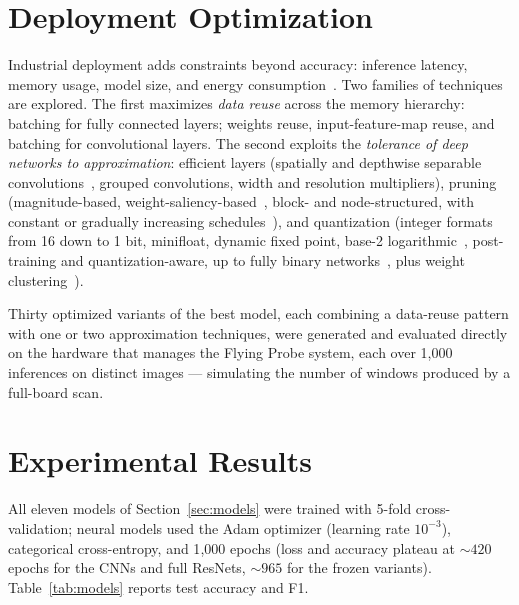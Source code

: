 \documentclass[10pt,twocolumn,a4paper]{article}
\begin{document}
\section{Deployment Optimization}
\label{sec:deploy}
Industrial deployment adds constraints beyond accuracy: inference latency, memory usage, model size, and energy consumption~\cite{sze2017efficient,moons2016energy}. Two families of techniques are explored. The first maximizes \emph{data reuse} across the memory hierarchy: batching for fully connected layers; weights reuse, input-feature-map reuse, and batching for convolutional layers. The second exploits the \emph{tolerance of deep networks to approximation}: efficient layers (spatially and depthwise separable convolutions~\cite{howard2017mobilenets,guo2018decoupling}, grouped convolutions, width and resolution multipliers), pruning (magnitude-based, weight-saliency-based~\cite{kallakuri2024saliency}, block- and node-structured, with constant or gradually increasing schedules~\cite{han2015learning}), and quantization (integer formats from 16 down to 1 bit, minifloat, dynamic fixed point, base-2 logarithmic~\cite{lee2017lognet}, post-training and quantization-aware, up to fully binary networks~\cite{rastegari2016xnor}, plus weight clustering~\cite{han2015deepcompression,choi2016limit}).

Thirty optimized variants of the best model, each combining a data-reuse pattern with one or two approximation techniques, were generated and evaluated directly on the hardware that manages the Flying Probe system, each over 1{,}000 inferences on distinct images --- simulating the number of windows produced by a full-board scan.

\section{Experimental Results}
\label{sec:results}
All eleven models of Section~\ref{sec:models} were trained with 5-fold cross-validation; neural models used the Adam optimizer (learning rate $10^{-3}$), categorical cross-entropy, and 1{,}000 epochs (loss and accuracy plateau at ${\sim}420$ epochs for the CNNs and full ResNets, ${\sim}965$ for the frozen variants). Table~\ref{tab:models} reports test accuracy and F1.
\end{document}
